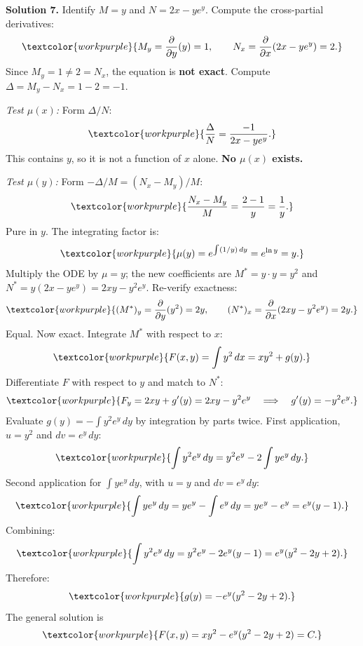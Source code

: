 \medskip

\noindent\textbf{Solution 7.}\quad
Identify $M = y$ and $N = 2x - ye^y$.
Compute the cross-partial derivatives:
\[
  \textcolor{workpurple}{M_y
  = \frac{\partial}{\partial y}(y)
  = 1,
  \qquad
  N_x
  = \frac{\partial}{\partial x}(2x - ye^y)
  = 2.}
\]
Since $M_y = 1 \neq 2 = N_x$, the equation is \textbf{not exact}.
Compute $\Delta = M_y - N_x = 1 - 2 = -1$.

\noindent\textit{Test $\mu(x)$:} Form $\Delta/N$:
\[
  \textcolor{workpurple}{\frac{\Delta}{N}
  = \frac{-1}{2x - ye^y}.}
\]
This contains $y$, so it is not a function of $x$ alone. \textbf{No $\mu(x)$
exists.}

\noindent\textit{Test $\mu(y)$:} Form $-\Delta/M = (N_x - M_y)/M$:
\[
  \textcolor{workpurple}{\frac{N_x - M_y}{M}
  = \frac{2 - 1}{y}
  = \frac{1}{y}.}
\]
Pure in $y$. The integrating factor is:
\[
  \textcolor{workpurple}{\mu(y)
  = e^{\int (1/y)\,dy}
  = e^{\ln y}
  = y.}
\]
Multiply the ODE by $\mu = y$; the new coefficients are
$M^* = y\cdot y = y^2$ and $N^* = y(2x - ye^y) = 2xy - y^2 e^y$.
Re-verify exactness:
\[
  \textcolor{workpurple}{(M^*)_y
  = \frac{\partial}{\partial y}(y^2)
  = 2y,
  \qquad
  (N^*)_x
  = \frac{\partial}{\partial x}(2xy - y^2 e^y)
  = 2y.}
\]
Equal. Now exact. Integrate $M^*$ with respect to $x$:
\[
  \textcolor{workpurple}{F(x,y)
  = \int y^2\,dx
  = xy^2 + g(y).}
\]
Differentiate $F$ with respect to $y$ and match to $N^*$:
\[
  \textcolor{workpurple}{F_y = 2xy + g'(y) = 2xy - y^2 e^y
  \quad\Longrightarrow\quad g'(y) = -y^2 e^y.}
\]
Evaluate $g(y) = -\int y^2 e^y\,dy$ by integration by parts twice.
First application, $u = y^2$ and $dv = e^y\,dy$:
\[
  \textcolor{workpurple}{\int y^2 e^y\,dy
  = y^2 e^y - 2\int y e^y\,dy.}
\]
Second application for $\int y e^y\,dy$, with $u = y$ and $dv = e^y\,dy$:
\[
  \textcolor{workpurple}{\int y e^y\,dy
  = ye^y - \int e^y\,dy
  = ye^y - e^y
  = e^y(y - 1).}
\]
Combining:
\[
  \textcolor{workpurple}{\int y^2 e^y\,dy
  = y^2 e^y - 2e^y(y-1)
  = e^y(y^2 - 2y + 2).}
\]
Therefore:
\[
  \textcolor{workpurple}{g(y) = -e^y(y^2 - 2y + 2).}
\]
The general solution is
\[
  \textcolor{workpurple}{F(x,y) = xy^2 - e^y(y^2 - 2y + 2) = C.}
\]

\medskip

